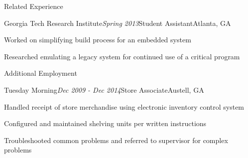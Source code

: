 \documentclass[11pt]{resume} %
\begin{document}
\begin{rSection}{Related Experience}

\begin{rSubsection}{Georgia Tech Research Institute}{\em Spring 2013}{Student Assistant}{Atlanta, GA}
\item Worked on simplifying build process for an embedded system
\item Researched emulating a legacy system for continued use of a critical program
\end{rSubsection}

\end{rSection}


\begin{rSection}{Additional Employment}

\begin{rSubsection}{Tuesday Morning}{\em Dec 2009 - Dec 2014}{Store Associate}{Austell, GA}
\item Handled receipt of store merchandise using electronic inventory control system
\item Configured and maintained shelving units per written instructions
\item Troubleshooted common problems and referred to supervisor for complex problems
\end{rSubsection}

\end{rSection}

\end{document}
